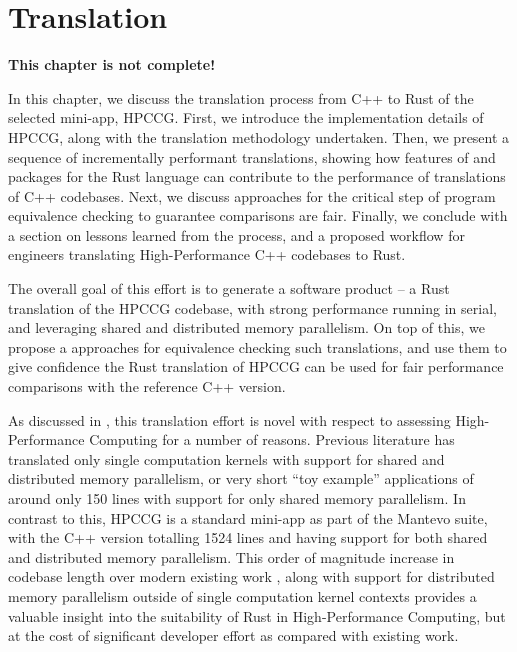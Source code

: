 
\chapter{Translation}
\label{ch:translation} %


\textbf{This chapter is not complete!}

In this chapter, we discuss the translation process from C++ to Rust of the selected mini-app, HPCCG. First, we introduce the implementation details of HPCCG, along with the translation methodology undertaken. Then, we present a sequence of incrementally performant translations, showing how features of and packages for the Rust language can contribute to the performance of translations of C++ codebases. Next, we discuss approaches for the critical step of program equivalence checking to guarantee comparisons are fair. Finally, we conclude with a section on lessons learned from the process, and a proposed workflow for engineers translating High-Performance C++ codebases to Rust.

The overall goal of this effort is to generate a software product -- a Rust translation of the HPCCG codebase, with strong performance running in serial, and leveraging shared and distributed memory parallelism. On top of this, we propose a approaches for equivalence checking such translations, and use them to give confidence the Rust translation of HPCCG can be used for fair performance comparisons with the reference C++ version.

As discussed in , this translation effort is novel with respect to assessing High-Performance Computing for a number of reasons. Previous literature has translated only single computation kernels \cite{} with support for shared and distributed memory parallelism, or very short ``toy example'' applications of around only 150 lines \cite{} \cite{} with support for only shared memory parallelism. In contrast to this, HPCCG is a standard mini-app as part of the Mantevo suite, with the C++ version totalling 1524 lines and having support for both shared and distributed memory parallelism. This order of magnitude increase in codebase length over modern existing work \cite{moranEmergingTechnologiesRust2023} \cite{costanzoPerformanceVsProgramming2021}, along with support for distributed memory parallelism outside of single computation kernel contexts provides a valuable insight into the suitability of Rust in High-Performance Computing, but at the cost of significant developer effort as compared with existing work.

